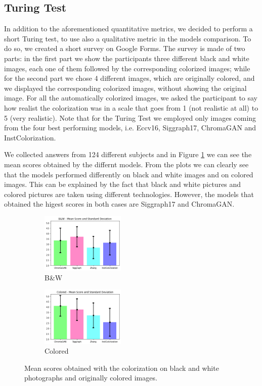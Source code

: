 \subsection{Turing Test}
In addition to the aforementioned quantitative metrics, we decided to perform a short Turing test, to use also
a qualitative metric in the models comparison. To do so, we created a short survey on Google Forms. The survey is
made of two parts: in the first part we show the participants three different black and white images, each one of
them followed by the corresponding colorized images; while for the second part we chose 4 different images, which
are originally colored, and we displayed the corresponding colorized images, without showing the original image.
For all the automatically colorized images, we asked the participant to say how realist the colorization was in a
scale that goes from 1 (not realistic at all) to 5 (very realistic). Note that for the Turing Test we employed only images coming from the four best
performing models, i.e. Eccv16, Siggraph17, ChromaGAN and InstColorization.

We collected answers from 124 different subjects and in Figure \ref{fig:turing} we can see the mean scores
obtained by the differnt models. From the plots we can clearly see that the models performed differently on black and white images and on colored
images. This can be explained by the fact that black and white pictures and colored pictures are taken using
different technologies.
However, the models that obtained the higest scores in both cases are Siggraph17 and ChromaGAN.

\begin{figure}[h]
	\centering
	\captionsetup[subfigure]{labelformat=empty}
	\begin{subfigure}[b]{0.1\textwidth}
		\begin{adjustwidth}{-1.1cm}{}
		\includegraphics[width=4cm]{bw turing.png}
		\end{adjustwidth}
	\caption{B\&W}
	\end{subfigure}
\hspace{2.3cm}
	\begin{subfigure}[b]{0.1\textwidth}
		\begin{adjustwidth}{-1.1cm}{}
			\includegraphics[width=4cm]{col turing.png}
		\end{adjustwidth}
		\caption{Colored}
	\end{subfigure}
	\caption{{\small Mean scores obtained with the colorization on black and white photographs and originally colored images.}}
	\label{fig:turing}
\end{figure}